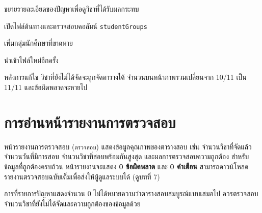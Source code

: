 
\begin{steps}
  \item ขยายรายละเอียดของปัญหาเพื่อดูวิชาที่ได้รับผลกระทบ
  \item เปิดไฟล์ต้นทางและตรวจสอบคอลัมน์ \texttt{studentGroups}
  \item เพิ่มกลุ่มนักศึกษาที่ขาดหาย
  \item นำเข้าไฟล์ใหม่อีกครั้ง
\end{steps}

\begin{expected}
หลังการแก้ไข วิชาที่ยังไม่ได้จัดจะถูกจัดตารางได้
จำนวนบนหน้าภาพรวมเปลี่ยนจาก 10/11 เป็น 11/11 และข้อผิดพลาดจะหายไป
\end{expected}

\section{การอ่านหน้ารายงานการตรวจสอบ}

หน้ารายงานการตรวจสอบ (\texttt{ตรวจสอบ}) แสดงข้อมูลคุณภาพของตารางสอบ
เช่น จำนวนวิชาที่จัดแล้ว จำนวนวันที่มีการสอบ จำนวนวิชาที่สอบพร้อมกันสูงสุด
และผลการตรวจสอบความถูกต้อง สำหรับข้อมูลที่ถูกต้องครบถ้วน
หน้ารายงานจะแสดง \textbf{0 ข้อผิดพลาด} และ \textbf{0 คำเตือน}
สามารถดาวน์โหลดรายงานตรวจสอบฉบับเต็มเพื่อส่งให้ผู้ดูแลระบบได้ (ดูบทที่ 7)

\begin{note}
การที่รายการปัญหาแสดงจำนวน 0 ไม่ได้หมายความว่าตารางสอบสมบูรณ์แบบเสมอไป
ควรตรวจสอบจำนวนวิชาที่ยังไม่ได้จัดและความถูกต้องของข้อมูลด้วย
\end{note}



